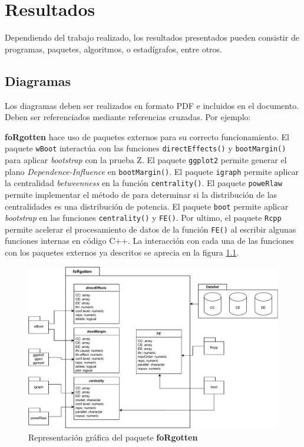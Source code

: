 \chapter{Resultados}

Dependiendo del trabajo realizado, los resultados presentados pueden consistir de programas, paquetes, algoritmos, o estadígrafos, entre otros.

\section{Diagramas}
Los diagramas deben ser realizados en formato PDF e incluidos en el documento. Deben ser referenciados mediante referencias cruzadas. Por ejemplo:

\textbf{foRgotten} hace uso de paquetes externos para su correcto funcionamiento. El paquete \texttt{wBoot} \parencite{wBoot} interactúa con las funciones \texttt{directEffects()} y \texttt{bootMargin()} para aplicar \emph{bootstrap} con la prueba Z. El paquete \texttt{ggplot2} \parencite{ggplot2} permite generar el plano \emph{Dependence-Influence} en \texttt{bootMargin()}. El paquete \texttt{igraph} \parencite{igraph_article} permite aplicar la centralidad \emph{betweenness} en la función \texttt{centrality()}. El paquete \texttt{poweRlaw} \parencite{gillespie2014fitting} permite implementar el método de \textcite{clauset2009power} para determinar si la distribución de las centralidades es una distribución de potencia. El paquete \texttt{boot} \parencite{BootstrapMethods} permite aplicar \emph{bootstrap} en las funciones \texttt{centrality()} y \texttt{FE()}. Por ultimo, el paquete \texttt{Rcpp} permite acelerar el procesamiento de datos de la función \texttt{FE()} al escribir algunas funciones internas en código C++. La interacción con cada una de las funciones con los paquetes externos ya descritos se aprecia en la figura \ref{figure: diagrama-1}.


\begin{figure}[H]
  \centering
  \includegraphics[width=\textwidth]{files/ESTRUCTURApaquete.pdf}
  \caption{Representación gráfica del paquete \textbf{foRgotten}}
  \label{figure: diagrama-1}
\end{figure}

